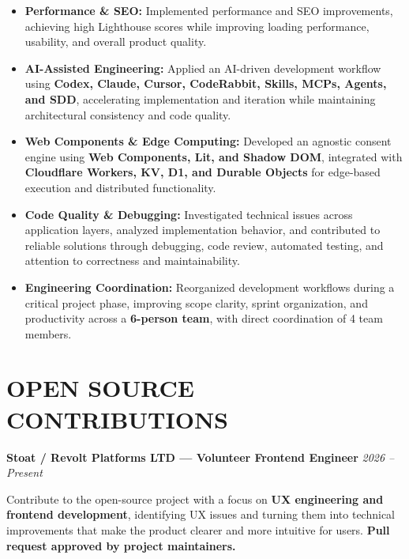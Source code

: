 \documentclass[10pt,a4paper]{article}
\begin{document}
\begin{itemize}
    \item
    \textbf{Performance \& SEO:}
    Implemented performance and SEO improvements, achieving
    high Lighthouse scores while improving loading performance,
    usability, and overall product quality.

    \item
    \textbf{AI-Assisted Engineering:}
    Applied an AI-driven development workflow using
    \textbf{Codex, Claude, Cursor, CodeRabbit, Skills, MCPs,
    Agents, and SDD}, accelerating implementation and iteration
    while maintaining architectural consistency and code quality.

    \item
    \textbf{Web Components \& Edge Computing:}
    Developed an agnostic consent engine using
    \textbf{Web Components, Lit, and Shadow DOM}, integrated with
    \textbf{Cloudflare Workers, KV, D1, and Durable Objects}
    for edge-based execution and distributed functionality.

    \item
    \textbf{Code Quality \& Debugging:}
    Investigated technical issues across application layers,
    analyzed implementation behavior, and contributed to reliable
    solutions through debugging, code review, automated testing,
    and attention to correctness and maintainability.

    \item
    \textbf{Engineering Coordination:}
    Reorganized development workflows during a critical project phase,
    improving scope clarity, sprint organization, and productivity
    across a \textbf{6-person team}, with direct coordination of
    4 team members.

\end{itemize}


\section*{OPEN SOURCE CONTRIBUTIONS}

\noindent
\textbf{Stoat / Revolt Platforms LTD — Volunteer Frontend Engineer}
\hfill
\textit{2026 -- Present}

\footnotesize

Contribute to the open-source project with a focus on
\textbf{UX engineering and frontend development}, identifying
UX issues and turning them into technical improvements that make
the product clearer and more intuitive for users.
\textbf{Pull request approved by project maintainers.}
\end{document}
